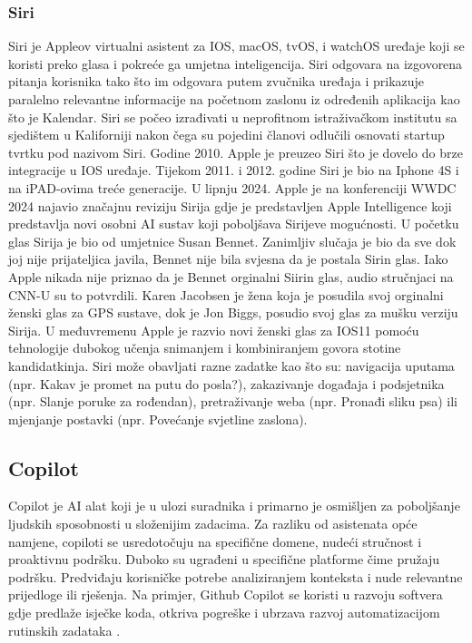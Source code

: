 \documentclass[]{foi}
\begin{document}
\subsubsection{Siri}

Siri je Appleov virtualni asistent za IOS, macOS, tvOS, i watchOS uređaje koji se koristi preko glasa i pokreće ga umjetna inteligencija. Siri odgovara na izgovorena pitanja korisnika
tako što im odgovara putem zvučnika uređaja i prikazuje paralelno relevantne informacije na početnom zaslonu iz određenih aplikacija kao što je Kalendar. Siri se počeo izrađivati
u neprofitnom istraživačkom institutu sa sjedištem u Kaliforniji nakon čega su pojedini članovi odlučili osnovati startup tvrtku pod nazivom Siri. Godine 2010. Apple je preuzeo Siri što
je dovelo do brze integracije u IOS uređaje. Tijekom 2011. i 2012. godine Siri je bio na Iphone 4S i na iPAD-ovima treće generacije. U lipnju 2024. Apple je na konferenciji WWDC 2024 najavio značajnu
reviziju Sirija gdje je predstavljen Apple Intelligence koji predstavlja novi osobni AI sustav koji poboljšava Sirijeve mogućnosti. U početku glas Sirija je bio od umjetnice Susan Bennet. Zanimljiv slučaja
je bio da sve dok joj nije prijateljica javila, Bennet nije bila svjesna da je postala Sirin glas. Iako Apple nikada nije priznao da je Bennet orginalni Siirin glas, audio stručnjaci na CNN-U
su to potvrdili. Karen Jacobsen je žena koja je posudila svoj orginalni ženski glas za GPS sustave, dok je Jon Biggs, posudio svoj glas za mušku verziju Sirija. U međuvremenu Apple je razvio novi ženski glas za IOS11
pomoću tehnologije dubokog učenja snimanjem i kombiniranjem govora stotine kandidatkinja. Siri može obavljati razne zadatke kao što su: navigacija uputama (npr. Kakav je promet na putu do posla?),
zakazivanje događaja i podsjetnika (npr. Slanje poruke za rođendan), pretraživanje weba (npr. Pronađi sliku psa) ili mjenjanje postavki (npr. Povećanje svjetline zaslona).

\subsection{Copilot}

Copilot je AI alat koji je u ulozi suradnika i primarno je osmišljen za poboljšanje ljudskih sposobnosti u složenijim zadacima. Za razliku od asistenata opće namjene, copiloti se usredotočuju na specifične domene,
nudeći stručnost i proaktivnu podršku. Duboko su ugrađeni u specifične platforme čime pružaju podršku. Predviđaju korisničke potrebe analiziranjem konteksta i nude relevantne prijedloge ili rješenja.
Na primjer, Github Copilot se koristi u razvoju softvera gdje predlaže isječke koda, otkriva pogreške i ubrzava razvoj automatizacijom rutinskih zadataka \cite{exomindset2025difference}.
\end{document}
